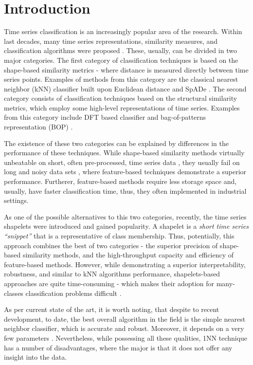 \documentclass{llncs}
\begin{document}
\section{Introduction}
%
Time series classification is an increasingly popular area of the research. 
Within last decades, many time series representations, similarity measures, 
and classification algorithms were proposed \cite{review}. 
These, usually, can be divided in two major categories. 
The first category of classification techniques is based on the shape-based 
similarity metrics - where distance is measured directly between time series points. 
Examples of methods from this category are the classical nearest neighbor (kNN)
classifier built upon Euclidean distance \cite{1NN} and SpADe \cite{spade}. 
The second category consists of classification techniques based on the 
structural similarity metrics, which employ some high-level representations 
of time series. Examples from this category include DFT based classifier \cite{DFT}
and bag-of-patterns representation (BOP) \cite{bag_patterns}. 

The existence of these two categories can be explained by differences in the 
performance of these techniques. 
While shape-based similarity methods virtually unbeatable on short, 
often pre-processed, time series data \cite{benchmark}, 
they usually fail on long and noisy data sets \cite{indexing},
where feature-based techniques demonstrate a superior performance. 
Furtherer, feature-based methods require less storage space and, usually, 
have faster classification time, thus, they often implemented in industrial settings. 

As one of the possible alternatives to this two categories, recently, the time series shapelets
were introduced \cite{shapelet} and gained popularity. A shapelet is a \textit{short time 
series ``snippet''} that is a representative of class membership. Thus, potentially, this 
approach combines the best of two categories - the superior precision of shape-based 
similarity methods, and the high-throughput capacity and efficiency of feature-based 
methods.
However, while demonstrating a superior interpretability, robustness, 
and similar to kNN algorithms performance, shapelets-based approaches are quite time-consuming 
- which makes their adoption for many-classes classification problems difficult \cite{bagnal}. 

As per current state of the art, it is worth noting, that despite to recent development, to date,
the best overall algorithm in the field is the simple nearest neighbor classifier, which is 
accurate and robust. Moreover, it depends on a very few parameters \cite{benchmark} 
\cite{comparison} \cite{classifiers}. Nevertheless, while possessing all these qualities,
1NN technique has a number of disadvantages, where the major is that it does not offer any 
insight into the data.
\end{document}
